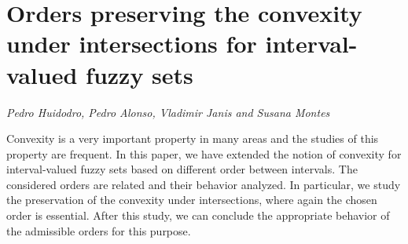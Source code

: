 \documentclass[../booklet.tex]{subfiles}
\begin{document}
\section[Orders preserving the convexity under intersections for interval-valued fuzzy sets. {\it Pedro Huidodro, Pedro Alonso, Vladimir Janis and Susana Montes}]{Orders preserving the convexity under intersections for interval-valued fuzzy sets}
   

\begin{center}
  {\it Pedro Huidodro, Pedro Alonso, Vladimir Janis and Susana Montes}
\end{center}

\vskip 0.8cm


Convexity is a very important property in many areas and the studies of this property are frequent. In this paper, we have extended the notion of convexity for interval-valued fuzzy sets based on different order between intervals. The considered orders are related and their behavior analyzed. In particular, we study the preservation of the convexity under intersections, where again the chosen order is essential. After this study, we can conclude the appropriate behavior of the admissible orders for this purpose.

\end{document}

